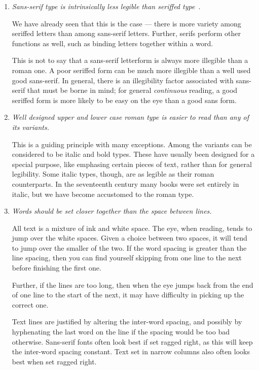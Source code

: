 \documentclass[10pt,letterpaper,extrafontsizes]{memoir}
\begin{document}
\begin{enumerate}
\item \emph{Sans-serif type is intrinsically less legible than seriffed type}~\autocite{WHEILDON95}.

    We have already seen that this is the case --- there is more variety
among seriffed letters than among sans-serif letters. Further, serifs
perform other functions as well, such as binding letters together within
a word.

    This is not to say that a sans-serif letterform is always more illegible
than a roman one. A poor seriffed form can be much more illegible than
a well used good sans-serif. In general, there is an illegibility factor
associated with sans-serif that must be borne in mind; for general
\emph{continuous} reading, a good seriffed form is more likely to be
easy on the eye than a good sans form.

\item \emph{Well designed upper and lower case roman type is easier to read than
any of its variants.}

    This is a guiding principle with many exceptions. Among the variants
can be considered to be italic and bold types. These have usually been
designed for a special purpose, like emphasing 
certain pieces of text, rather
than for general legibility. Some italic types, though, are as legible as their
roman counterparts. In the seventeenth century many books were set entirely
in italic, but we have become accustomed to the roman type.

\item \emph{Words should be set closer together than the space between lines.}

    All text is a mixture of ink and white space. The eye, when reading, 
tends to jump over the white spaces. Given a choice between two spaces, it 
will tend to jump over the smaller of the two. If the word spacing is greater
than the line spacing, then you can find yourself skipping from one line
to the next before finishing the first one.

    Further, if the lines are too long, then when the eye jumps back from
the end of one line to the start of the next, it may have difficulty in 
picking up the correct one.

    Text lines are justified by altering the inter-word spacing, and possibly
by hyphenating the last word on the line if the spacing would be too bad
otherwise. Sans-serif fonts often look best if set ragged right, as this will
keep the inter-word spacing constant. Text set in narrow 
columns also often
looks best when set ragged right.


\end{enumerate}
\end{document}
